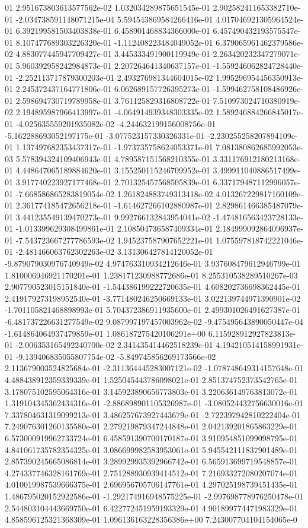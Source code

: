 01	2.951673803613577562e-02	1.032034289875651545e-01	2.902582411653382710e-01	-2.034738591148071215e-04	5.594543869584266416e-01	4.017046921305964524e-01	6.392199581503403838e-01	6.458901468834366000e-01	6.457490432193575547e-01	8.107477689303226320e-01	-1.112408223484049052e-01	6.379065961462379586e-02	4.883077445947709427e-01	3.445333491900119949e-01	2.263420232347279071e-01	5.960392958242984873e-01	2.207264641340637157e-01	-1.559246062824728440e-01	-2.252113717879300203e-01	2.493276981344604015e-02	1.995296954456350913e-01	2.245372437164771806e-01	6.062689157726395273e-01	-1.599462758108486926e-01	2.598694730719789958e-01	3.761125829316808722e-01	7.510973024710380919e-02	2.194895987966413997e-01	-4.064914939348303335e-02	1.589246884266845017e-01	-4.025635559201935082e-02	-4.244632199156008756e-01	-5.162288693052197175e-01	-3.077523157330326331e-01	-2.230255258207894109e-01	1.137497682353437317e-01	-1.973735758624053371e-01	7.081380862685992053e-03	5.578394324109406943e-01	4.789587151568210355e-01	3.331176912180213168e-01	4.448647065189884620e-01	3.155250115246709952e-01	3.499911040886517499e-01	3.917740223927177468e-01	2.701325457568505839e-01	6.337179487112996057e-01	-7.668586865283819054e-02	1.261824883749313418e-02	4.013267229817160109e-01	2.361774185472656218e-01	-1.614627266102880987e-01	2.829861466385487079e-01	3.441235549139470273e-01	9.992766132843954041e-02	-1.474816563423728133e-01	-1.013399629308499861e-01	2.108504736587409334e-01	2.184999092864096937e-01	-7.543723667277786593e-02	1.945237587907652221e-01	1.075597818742221046e-01	-2.481466063762302263e-02	3.131306427814120052e-01	-9.879079030976740949e-02	4.974763310934212646e-01	3.937608479612946799e-01	1.810006946921170201e-01	1.238171230988772686e-01	8.255310538289510267e-03	2.907790523015151840e-01	-1.544386199222720635e-01	4.608202736698362445e-01	2.419179273198952540e-01	-3.771480246250669133e-01	3.022139744971390901e-02	-1.701105821468898993e-01	5.704372386911935600e-01	2.499301026491627387e-01	-6.481737226631277549e-02	9.087997197457003962e-02	-9.475495643890050447e-04	-1.614864064937479859e-01	1.086187275420106291e+00	6.115928912927823813e-01	-2.006353165492240700e-02	2.341435414462518239e-01	4.194210514158991931e-01	-9.139406835055807754e-02	-5.849745856269173566e-02	2.113679003524825684e-01	-2.311364445283007121e-02	-1.078748649314157648e-01	4.488438912359339339e-01	1.525045443786098021e-01	2.851374752373542765e-01	3.178075102595064316e-01	3.145923890656773803e-01	3.220636149763813072e-01	1.319104345362434316e-01	-2.886898901105326987e-01	-3.080524432756630016e-01	7.337804631319099213e-01	3.486257673927443679e-01	-2.722397942810222404e-01	7.249076301260135580e-01	2.279219879347244848e-01	2.042139201865863229e-01	6.573000919962733724e-01	6.458591390700170187e-01	3.910954851099098795e-01	4.841061735782354325e-01	3.086699982583953061e-01	5.945542111837901489e-01	2.857390245665086814e-01	3.289929935392966742e-01	6.565913699719548857e-01	4.274337746328161769e-01	2.751288930939414512e-01	7.216933272080207074e-01	4.010019987539666375e-01	2.696956705706147761e-01	4.297025198739451435e-01	1.486795020152922586e-01	-1.292174916948575225e-01	-2.997698778976250478e-01	2.544803104443669750e-01	6.422772451959193329e-01	4.901899774471983329e-01	4.858596125321368309e-01	1.096136163228356386e+00	7.243007704104154065e-0